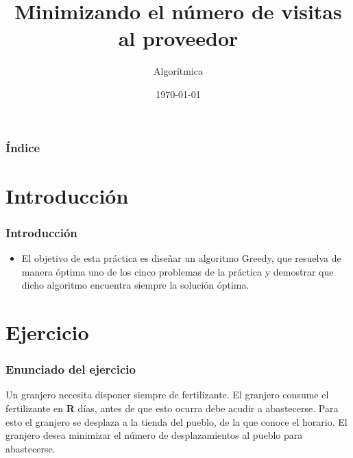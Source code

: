 \documentclass{beamer}
\title[Practica 3]{Minimizando el número de visitas al proveedor} %
\author{Algorítmica} %
\institute[UGR] %
{
Universidad de Granada \\ %
\medskip

}
\date{\today} %
\begin{document}
\begin{frame}
\titlepage %
\end{frame}

\begin{frame}
\frametitle{Índice} %
\tableofcontents %
\end{frame}


\section{Introducción }
\begin{frame}
	\frametitle{Introducción}
	\begin{itemize}
		\item El objetivo de esta práctica es diseñar un algoritmo Greedy, que resuelva de manera óptima uno de los cinco problemas de la práctica y demostrar que dicho algoritmo encuentra siempre la solución óptima.
	\end{itemize}
\end{frame}


\section{Ejercicio} 
\begin{frame}
	\frametitle{Enunciado del ejercicio}
	Un granjero necesita disponer siempre de fertilizante. El granjero consume el fertilizante en \textbf{R} días, antes de que esto ocurra debe acudir a abastecerse. Para esto el granjero se desplaza a la tienda del pueblo, de la que conoce el horario. El granjero desea minimizar el número de desplazamientos al pueblo para abastecerse.
	
\end{frame}
\end{document}
